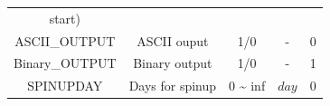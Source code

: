 \documentclass[]{scrbook}
\begin{document}
\begin{longtable}[]{@{}ccccc@{}}
\begin{minipage}[t]{0.26\columnwidth}
start)\strut
\end{minipage}\tabularnewline
\begin{minipage}[t]{0.17\columnwidth}\centering\strut
ASCII\_OUTPUT\strut
\end{minipage} & \begin{minipage}[t]{0.23\columnwidth}\centering\strut
ASCII ouput\strut
\end{minipage} & \begin{minipage}[t]{0.10\columnwidth}\centering\strut
1/0\strut
\end{minipage} & \begin{minipage}[t]{0.10\columnwidth}\centering\strut
-\strut
\end{minipage} & \begin{minipage}[t]{0.26\columnwidth}\centering\strut
0\strut
\end{minipage}\tabularnewline
\begin{minipage}[t]{0.17\columnwidth}\centering\strut
Binary\_OUTPUT\strut
\end{minipage} & \begin{minipage}[t]{0.23\columnwidth}\centering\strut
Binary output\strut
\end{minipage} & \begin{minipage}[t]{0.10\columnwidth}\centering\strut
1/0\strut
\end{minipage} & \begin{minipage}[t]{0.10\columnwidth}\centering\strut
-\strut
\end{minipage} & \begin{minipage}[t]{0.26\columnwidth}\centering\strut
1\strut
\end{minipage}\tabularnewline
\begin{minipage}[t]{0.17\columnwidth}\centering\strut
SPINUPDAY\strut
\end{minipage} & \begin{minipage}[t]{0.23\columnwidth}\centering\strut
Days for spinup\strut
\end{minipage} & \begin{minipage}[t]{0.10\columnwidth}\centering\strut
0 \textasciitilde{} inf\strut
\end{minipage} & \begin{minipage}[t]{0.10\columnwidth}\centering\strut
\(day\)\strut
\end{minipage} & \begin{minipage}[t]{0.26\columnwidth}\centering\strut
0\strut
\end{minipage}\tabularnewline

\end{longtable}
\end{document}
